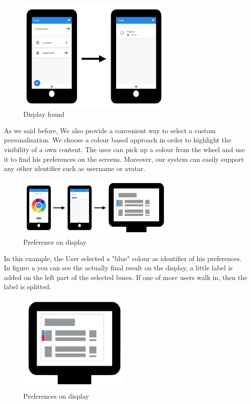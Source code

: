\documentclass[]{usiinfbachelorproject}
\begin{document}
\begin{figure}[H]
\centering
\includegraphics[width=0.7\textwidth]{./images/smartphone_displays}
\caption{Display found}
\end{figure}
As we said before, We also provide a convenient way to select a custom personalisation. We choose a colour based approach in order to highlight the visibility of a own content. The user can pick up a colour from the wheel and use it to find his preferences on the screens. Moreover, our system can easily support any other identifier such as username or avatar.
\begin{figure}[H]
  \centering
  \includegraphics[width=0.7\textwidth]{./images/smartphone_color_preference}
  \caption{Preference on display}
\end{figure}
In this example, the User selected a "blue" colour as identifier of his preferences. In figure \emph{u} you can see the actually final result on the display, a little label is added on the left part of the selected buses. If one of more users walk in, then the label is splitted.
\begin{figure}[H]
  \centering
\includegraphics[width=0.5\textwidth]{./images/preference_colour/preference_splited}
  \caption{Preferences on display}

\end{figure}
\end{document}

